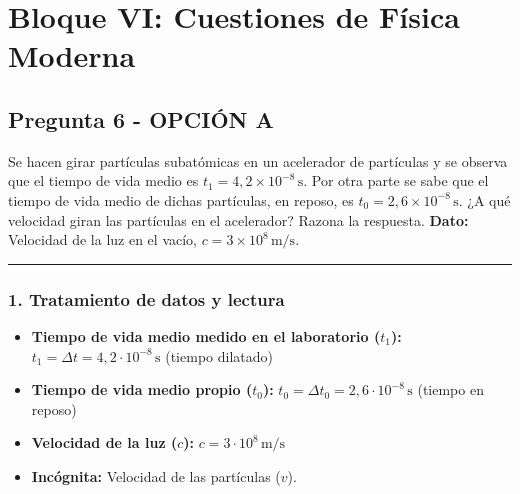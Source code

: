 \newpage

\section{Bloque VI: Cuestiones de Física Moderna}
\label{sec:moderna2_2002_jun_ord}

\subsection{Pregunta 6 - OPCIÓN A}
\label{subsec:6A_2002_jun_ord}

\begin{cajaenunciado}
Se hacen girar partículas subatómicas en un acelerador de partículas y se observa que el tiempo de vida medio es $t_1 = 4,2 \times 10^{-8}\,\text{s}$. Por otra parte se sabe que el tiempo de vida medio de dichas partículas, en reposo, es $t_0 = 2,6 \times 10^{-8}\,\text{s}$. ¿A qué velocidad giran las partículas en el acelerador? Razona la respuesta.
\textbf{Dato:} Velocidad de la luz en el vacío, $c=3\times10^8\,\text{m/s}$.
\end{cajaenunciado}
\hrule

\subsubsection*{1. Tratamiento de datos y lectura}
\begin{itemize}
    \item \textbf{Tiempo de vida medio medido en el laboratorio ($t_1$):} $t_1 = \Delta t = 4,2 \cdot 10^{-8} \, \text{s}$ (tiempo dilatado)
    \item \textbf{Tiempo de vida medio propio ($t_0$):} $t_0 = \Delta t_0 = 2,6 \cdot 10^{-8} \, \text{s}$ (tiempo en reposo)
    \item \textbf{Velocidad de la luz ($c$):} $c = 3 \cdot 10^8 \, \text{m/s}$
    \item \textbf{Incógnita:} Velocidad de las partículas ($v$).
\end{itemize}

